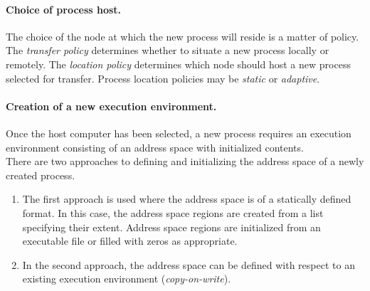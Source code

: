 \paragraph*{Choice of process host.} The choice of the node at which the new process will reside is a matter of policy.\\
The \textit{transfer policy} determines whether to situate a new process locally or
remotely. The \textit{location policy} determines which node should host a new process selected for transfer. Process location policies may be \textit{static} or \textit{adaptive}.

\paragraph*{Creation of a new execution environment.} Once the host computer has been selected, a new process requires an execution environment consisting of an address space with initialized contents.\\
There are two approaches to defining and initializing the address space of a newly created process. 
\begin{enumerate}
	\item The first approach is used where the address space is of a statically	defined format. In this case, the address space regions are created from a list specifying 	their extent. Address space regions are initialized from an executable file or filled with zeros as appropriate.
	\item In the second approach, the address space can be defined with respect to an existing execution environment (\textit{copy-on-write}).
\end{enumerate}

